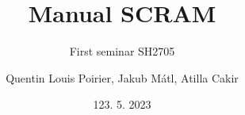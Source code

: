 

\title[APROS simulations of BWR transients]{Manual SCRAM}
\subtitle{First seminar SH2705}
\author{Quentin Louis Poirier, Jakub Mátl, Atilla Cakir}
\date[24/05/23]{123. 5. 2023}
\usepackage{comment}

\usepackage[style=authoryear-ibid,backend=biber]{biblatex}
\usepackage{pgfplots}
\pgfplotsset{compat=1.18}



\nologo %




\frame{\titlepage}


